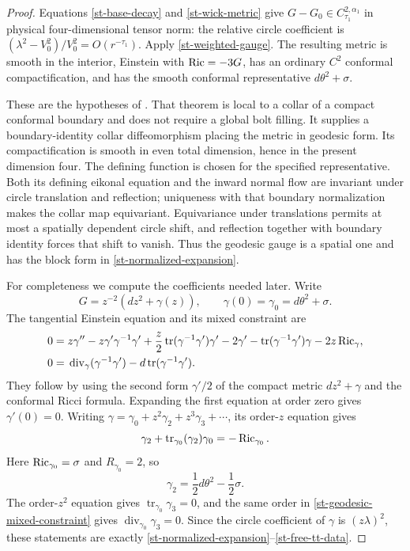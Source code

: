 \begin{proof}
Equations \eqref{st-base-decay} and \eqref{st-wick-metric} give
$G-G_0\in C^{2,\alpha_1}_{\tau_1}$ in physical four-dimensional
tensor norm: the relative circle coefficient is
$(\lambda^2-V_0^2)/V_0^2=O(r^{-\tau_1})$.
Apply \cref{st-weighted-gauge}.  The resulting metric is smooth
in the interior, Einstein with $\operatorname{Ric}=-3G$, has an ordinary $C^2$
conformal compactification, and has the smooth conformal
representative $d\theta^2+\sigma$.

These are the hypotheses of
\cite[Theorem~A]{cdls2005}.  That theorem is local to a collar of a
compact conformal boundary and does not require a global bolt
filling.  It supplies a boundary-identity collar diffeomorphism
placing the metric in geodesic form.  Its compactification is smooth
in even total dimension, hence in the present dimension four.
The defining function is chosen for the specified representative.
Both its defining eikonal equation and the inward normal flow
are invariant under circle translation and reflection; uniqueness
with that boundary normalization makes the collar map equivariant.
Equivariance under translations permits at most a spatially
dependent circle shift, and reflection together with boundary
identity forces that shift to vanish.  Thus the geodesic gauge is a
spatial one and has the block form in
\eqref{st-normalized-expansion}.

For completeness we compute the coefficients needed later.  Write
\[
 G=z^{-2}(dz^2+\gamma(z)),\qquad
 \gamma(0)=\gamma_0=d\theta^2+\sigma.
\]
The tangential Einstein equation and its mixed constraint are
\begin{align}
 0={}&z\gamma''-z\gamma'\gamma^{-1}\gamma'
  +\frac z2\operatorname{tr}(\gamma^{-1}\gamma')\gamma'
  -2\gamma'-\operatorname{tr}(\gamma^{-1}\gamma')\gamma
  -2z\operatorname{Ric}_{\gamma},
 \label{st-geodesic-einstein-equation}\\
 0={}&\operatorname{div}_{\gamma}
       (\gamma^{-1}\gamma')
       -d\operatorname{tr}(\gamma^{-1}\gamma').
 \label{st-geodesic-mixed-constraint}
\end{align}
They follow by using the second form $\gamma'/2$ of the compact
metric $dz^2+\gamma$ and the conformal Ricci formula.  Expanding the
first equation at order zero gives $\gamma'(0)=0$.
Writing $\gamma=\gamma_0+z^2\gamma_2+z^3\gamma_3+\cdots$, its
order-$z$ equation gives
\[
 \gamma_2+\operatorname{tr}_{\gamma_0}(\gamma_2)\gamma_0
 =-\operatorname{Ric}_{\gamma_0}.
\]
Here $\operatorname{Ric}_{\gamma_0}=\sigma$ and $R_{\gamma_0}=2$, so
\[
 \gamma_2=\frac12d\theta^2-\frac12\sigma.
\]
The order-$z^2$ equation gives
$\operatorname{tr}_{\gamma_0}\gamma_3=0$, and the same order in
\eqref{st-geodesic-mixed-constraint} gives
$\operatorname{div}_{\gamma_0}\gamma_3=0$.
Since the circle coefficient of $\gamma$ is $(z\lambda)^2$,
these statements are exactly
\eqref{st-normalized-expansion}--\eqref{st-free-tt-data}.


\end{proof}
